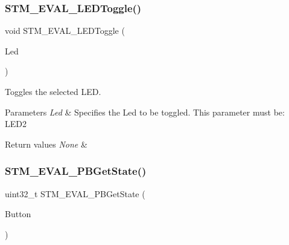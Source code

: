 \subsubsection{\texorpdfstring{STM\_EVAL\_LEDToggle()}{STM\_EVAL\_LEDToggle()}}
{\footnotesize\ttfamily void S\+T\+M\+\_\+\+E\+V\+A\+L\+\_\+\+L\+E\+D\+Toggle (\begin{DoxyParamCaption}\item[{\mbox{\hyperlink{group___s_t_m32_f1_x_x___n_u_c_l_e_o___l_o_w___l_e_v_e_l___exported___types_gaa059704b7ca945eb9c1e7f2c3d03fecd}{Led\+\_\+\+Type\+Def}}}]{Led }\end{DoxyParamCaption})}



Toggles the selected L\+ED. 


\begin{DoxyParams}{Parameters}
{\em Led} & Specifies the Led to be toggled. This parameter must be\+: L\+E\+D2 \\
\hline
\end{DoxyParams}

\begin{DoxyRetVals}{Return values}
{\em None} & \\
\hline
\end{DoxyRetVals}
\mbox{\label{group___s_t_m32_f1_x_x___n_u_c_l_e_o___l_o_w___l_e_v_e_l___private___functions_ga812ee2a84aaed235587ac81eb9269442}} 
\subsubsection{\texorpdfstring{STM\_EVAL\_PBGetState()}{STM\_EVAL\_PBGetState()}}
{\footnotesize\ttfamily uint32\+\_\+t S\+T\+M\+\_\+\+E\+V\+A\+L\+\_\+\+P\+B\+Get\+State (\begin{DoxyParamCaption}\item[{\mbox{\hyperlink{group___s_t_m32_f1_x_x___n_u_c_l_e_o___l_o_w___l_e_v_e_l___exported___types_ga643816dfbad5c734fc25a29ce8d35bb1}{Button\+\_\+\+Type\+Def}}}]{Button }\end{DoxyParamCaption})}



